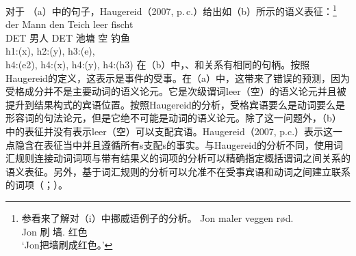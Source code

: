 \begin{exe}
\begin{xlist}[iv.]
\begin{exe}
\begin{xlist}[iv.]
对于 （a）中的句子，Haugereid（2007, p.\,c.）给出如（b）所示的语义表征：\footnote{
  参看来了解对（i）中挪威语例子的分析。
\ea
\gll Jon maler veggen rød.\\
     Jon 刷 墙. 红色\\
\glt `Jon把墙刷成红色。'
\zlast
}
\eal
\ex 
\gll der Mann den Teich leer fischt\\
	 DET 男人 DET 池塘 空 钓鱼\\
\ex h1:(x), h2:(y), h3:(e),\\
    h4:(e2), h4:(x), h4:(y), h4:(h3)
\zl
在（b）中，、和关系有相同的句柄。按照Haugereid的定义，这表示是事件的受事。在（a）中，这带来了错误的预测，因为受格成分并不是主要动词的语义论元。它是次级谓词leer（空）的语义论元并且被提升到结果构式的宾语位置。按照Haugereid的分析，受格宾语要么是动词要么是形容词的句法论元，但是它绝不可能是动词的语义论元。除了这一问题外，（b）中的表征并没有表示leer（空）可以支配宾语。Haugereid（2007, p.c.）表示这一点隐含在表征当中并且遵循所有s支配s的事实。与Haugereid的分析不同，使用词汇规则连接动词词项与带有结果义的词项的分析可以精确指定概括谓词之间关系的语义表征。另外，基于词汇规则的分析可以允准不在受事宾语和动词之间建立联系的词项（\citealp{Wechsler97a,WN2001a}；\citealp[Chapter~5]{Mueller2002b}）。

\end{xlist}
\end{exe}
\end{xlist}
\end{exe}
